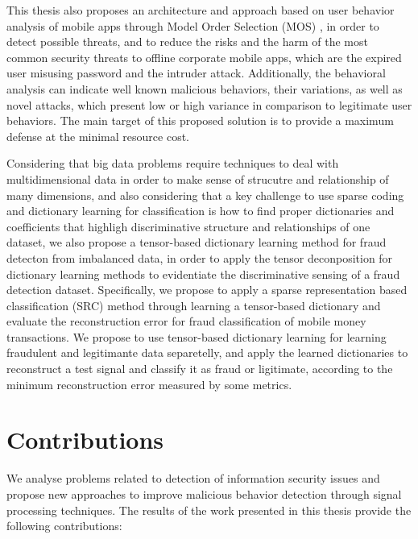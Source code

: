This thesis also proposes an architecture and approach based on user behavior analysis of mobile apps through Model Order Selection (MOS) \cite{tenorio2013greatest}, in order to detect possible threats, and to reduce the risks and the harm of the most common security threats to offline corporate mobile apps, which are the expired user misusing password and the intruder attack. Additionally, the behavioral analysis can indicate well known malicious behaviors, their variations, as well as novel attacks, which present low or high variance in comparison to legitimate user behaviors. The main target of this proposed solution is to provide a maximum defense at the minimal resource cost.

Considering that big data problems require techniques to deal with multidimensional data in order to make sense of strucutre and relationship of many dimensions, and also considering that a key challenge to use sparse coding and dictionary learning for classification is how to find proper dictionaries and coefficients that highligh discriminative structure and relationships of one dataset, we also propose a tensor-based dictionary learning method for fraud detecton from imbalanced data, in order to apply the tensor deconposition for dictionary learning methods to evidentiate the discriminative sensing of a fraud detection dataset. Specifically, we propose to apply a sparse representation based classification (SRC) method through learning a tensor-based dictionary and evaluate the reconstruction error for fraud classification of mobile money transactions. We propose to use tensor-based dictionary learning for learning fraudulent and legitimante data separetelly, and apply the learned dictionaries to reconstruct a test signal and classify it as fraud or ligitimate, according to the minimum reconstruction error measured by some metrics.


\section{Contributions}
\label{sc:contributions}

We analyse problems related to detection of information security issues and propose new approaches to improve malicious behavior detection through signal processing techniques. The results of the work presented in this thesis provide the following contributions:

